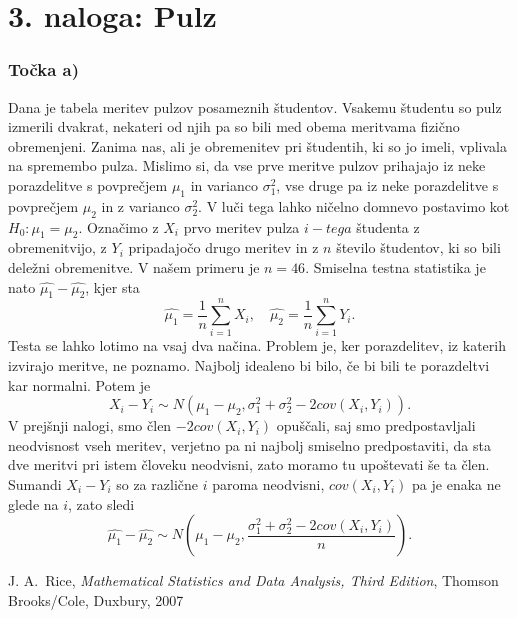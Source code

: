 \documentclass[12pt, letterpaper]{article}
\begin{document}
\section*{3. naloga: Pulz}

\subsubsection*{Točka a)} Dana je tabela meritev pulzov posameznih študentov. Vsakemu študentu so pulz izmerili dvakrat, nekateri od njih pa so bili med obema meritvama fizično obremenjeni. Zanima nas, ali je obremenitev pri študentih, ki so jo imeli, vplivala na spremembo pulza. Mislimo si, da vse prve meritve pulzov prihajajo iz neke porazdelitve s povprečjem $\mu_1$ in varianco $\sigma_1^2$, vse druge pa iz neke porazdelitve s povprečjem $\mu_2$ in z varianco $\sigma_2^2$. V luči tega lahko ničelno domnevo postavimo kot $H_0 : \mu_1 = \mu_2$. Označimo z $X_i$ prvo meritev pulza $i-tega$ študenta z obremenitvijo, z $Y_i$ pripadajočo drugo meritev in z $n$ število študentov, ki so bili deležni obremenitve. V našem primeru je $n = 46$. Smiselna testna statistika je nato $\hat{\mu_1} - \hat{\mu_2}$, kjer sta
\[
\hat{\mu_1} = \frac{1}{n}\sum_{i=1}^nX_i, \quad
\hat{\mu_2} = \frac{1}{n}\sum_{i=1}^nY_i.
\]
Testa se lahko lotimo na vsaj dva načina. Problem je, ker porazdelitev, iz katerih izvirajo meritve, ne poznamo. Najbolj idealeno bi bilo, če bi bili te porazdeltvi kar normalni. Potem je
\[
X_i - Y_i \sim N(\mu_1 - \mu_2, \sigma_1^2 + \sigma_2^2 - 2cov(X_i,Y_i)).
\]
V prejšnji nalogi, smo člen $-2cov(X_i,Y_i)$ opuščali, saj smo predpostavljali neodvisnost vseh meritev, verjetno pa ni najbolj smiselno predpostaviti, da sta dve meritvi pri istem človeku neodvisni, zato moramo tu upoštevati še ta člen. Sumandi $X_i - Y_i$ so za različne $i$ paroma neodvisni, $cov(X_i,Y_i)$ pa je enaka ne glede na $i$, zato sledi
\[
\hat{\mu_1} - \hat{\mu_2} \sim N\left(\mu_1 - \mu_2, \frac{\sigma_1^2 + \sigma_2^2 - 2cov(X_i,Y_i)}{n}\right).
\]

\begin{thebibliography}{99}
 J. A.~Rice, \emph{Mathematical Statistics and Data Analysis, Third Edition}, Thomson Brooks/Cole, Duxbury, 2007
\end{thebibliography}
\end{document}
